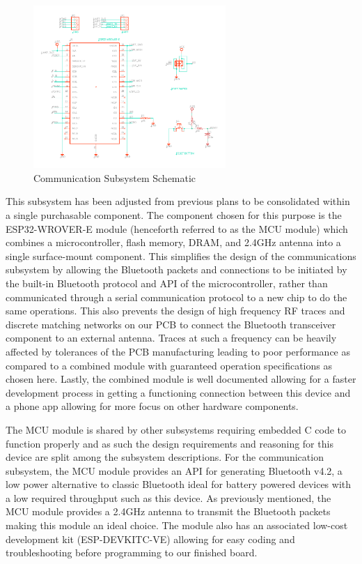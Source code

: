 \documentclass[12pt]{article}
\begin{document}
\begin{figure}[h!]
	\centering
	\includegraphics[width=0.65\textwidth]{Comms_Schem.png}
	\caption{Communication Subsystem Schematic}
	\label{fig:comm_schem}
\end{figure}

This subsystem has been adjusted from previous plans to be consolidated within a single purchasable component. The component chosen for this purpose is the ESP32-WROVER-E module (henceforth referred to as the MCU module) which combines a microcontroller, flash memory, DRAM, and 2.4GHz antenna into a single surface-mount component. This simplifies the design of the communications subsystem by allowing the Bluetooth packets and connections to be initiated by the built-in Bluetooth protocol and API of the microcontroller, rather than communicated through a serial communication protocol to a new chip to do the same operations. This also prevents the design of high frequency RF traces and discrete matching networks on our PCB to connect the Bluetooth transceiver component to an external antenna. Traces at such a frequency can be heavily affected by tolerances of the PCB manufacturing leading to poor performance as compared to a combined module with guaranteed operation specifications as chosen here. Lastly, the combined module is well documented allowing for a faster development process in getting a functioning connection between this device and a phone app allowing for more focus on other hardware components.

The MCU module is shared by other subsystems requiring embedded C code to function properly and as such the design requirements and reasoning for this device are split among the subsystem descriptions. For the communication subsystem, the MCU module provides an API for generating Bluetooth v4.2, a low power alternative to classic Bluetooth ideal for battery powered devices with a low required throughput such as this device. As previously mentioned, the MCU module provides a 2.4GHz antenna to transmit the Bluetooth packets making this module an ideal choice. The module also has an associated low-cost development kit (ESP-DEVKITC-VE) allowing for easy coding and troubleshooting before programming to our finished board.
\end{document}
